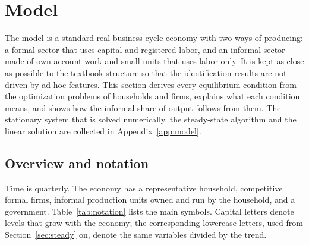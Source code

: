 \section{Model}
\label{sec:model}

The model is a standard real business-cycle economy with two ways of producing: a formal sector that uses capital and registered labor, and an informal sector made of own-account work and small units that uses labor only. It is kept as close as possible to the textbook structure so that the identification results are not driven by ad hoc features. This section derives every equilibrium condition from the optimization problems of households and firms, explains what each condition means, and shows how the informal share of output follows from them. The stationary system that is solved numerically, the steady-state algorithm and the linear solution are collected in Appendix~\ref{app:model}.

\subsection{Overview and notation}

Time is quarterly. The economy has a representative household, competitive formal firms, informal production units owned and run by the household, and a government. Table~\ref{tab:notation} lists the main symbols. Capital letters denote levels that grow with the economy; the corresponding lowercase letters, used from Section~\ref{sec:steady} on, denote the same variables divided by the trend.

